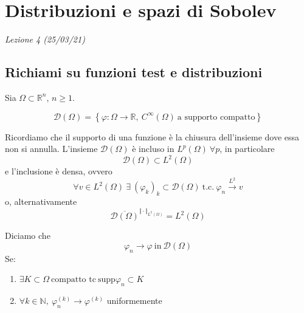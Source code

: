 \documentclass[10pt,a4paper,twoside,openright]{book}
\begin{document}
\chapter{Distribuzioni e spazi di Sobolev}
\textit{Lezione 4 (25/03/21)}
\section{Richiami su funzioni test e distribuzioni}

Sia $\displaystyle \Omega \subset \mathbb{R}^{n}$, $\displaystyle n\geqslant 1$. 
\begin{definition}
	\begin{equation*}
		\mathcal{D}( \Omega ) =\left\{\varphi :\Omega \rightarrow \mathbb{R} ,\ C^{\infty }( \Omega ) \ \text{a supporto compatto}\right\}
	\end{equation*}
\end{definition}
Ricordiamo che il supporto di una funzione è la chiusura dell'insieme dove essa non si annulla. L'insieme $\displaystyle \mathcal{D}( \Omega )$ è incluso in $\displaystyle L^{p}( \Omega ) \ \forall p$, in particolare
\begin{equation*}
	\mathcal{D}( \Omega ) \subset L^{2}( \Omega )
\end{equation*}
e l'inclusione è densa, ovvero
\begin{equation*}
	\forall v\in L^{2}( \Omega ) \ \exists \ ( \varphi _{k})_{k} \subset \mathcal{D}( \Omega ) \ \text{t.c.} \ \varphi _{n}\xrightarrow{L^{2}} v
\end{equation*}
o, alternativamente
\begin{equation*}
	\overline{\mathcal{D}( \Omega )}^{\Vert \cdotp \Vert _{L^{2}( \Omega )}} =L^{2}( \Omega )
\end{equation*}
\begin{definition}
	 Diciamo che 
	\begin{equation*}
		\varphi _{n}\rightarrow \varphi \ \text{in} \ \mathcal{D}( \Omega )
	\end{equation*}
	Se:
	\begin{enumerate}
		\item $\displaystyle \exists K\subset \Omega \ \text{compatto tc} \ \text{supp} \varphi _{n} \subset K$
		\item $\displaystyle \forall k\in \mathbb{N} ,\ \varphi ^{( k)}_{n}\rightarrow \varphi ^{( k)}$ uniformemente
	\end{enumerate}
\end{definition}
\end{document}
